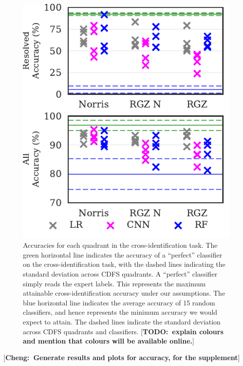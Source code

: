\documentclass[fleqn,usenatbib,usedcolumn]{mnras}
\newcommand{\cheng}[1]{ {\color{teal}[{\bf Cheng:~{#1}}]} }
\newcommand{\todo}[1]{ {\color{red}[{\bf TODO:~{#1}}]} }
\begin{document}
  \begin{figure}
  \centering
  \includegraphics[width=\columnwidth]{images/cdfs_cross_identification_grid.pdf}
  \caption{Accuracies for each quadrant in the cross-identification
    task. The green horizontal line indicates the accuracy of a ``perfect''
    classifier on the cross-identification task, with the dashed lines
    indicating the standard deviation across CDFS quadrants. A ``perfect''
    classifier simply reads the expert labels. This represents the maximum
    attainable cross-identification accuracy under our assumptions. The blue
    horizontal line indicates the average accuracy of 15 random classifiers, and
    hence represents the minimum accuracy we would expect to attain. The dashed
    lines indicate the standard deviation across CDFS quadrants and classifiers.
    \todo{explain colours and mention that colours will be available online.}
    \label{fig:cross-id-accuracy}}
  \end{figure}

  \cheng{Generate results and plots for accuracy, for the supplement}
\end{document}
